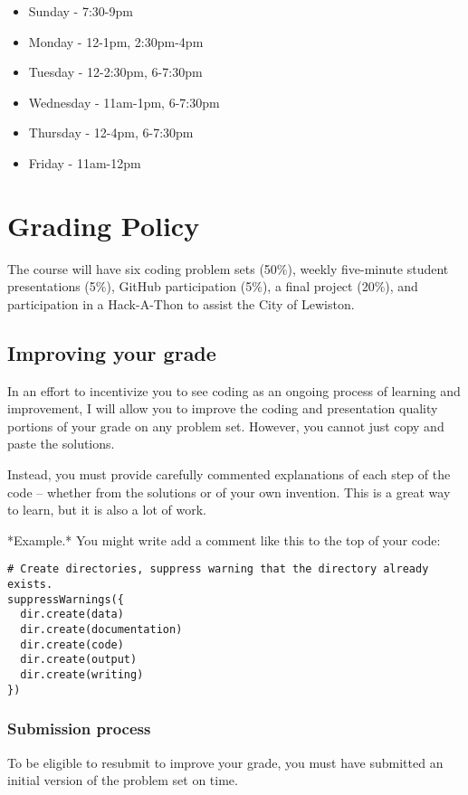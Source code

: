 \documentclass[11pt]{article}
\begin{document}
\begin{itemize}
  \item Sunday - 7:30-9pm
  \item Monday - 12-1pm, 2:30pm-4pm
  \item Tuesday - 12-2:30pm, 6-7:30pm
  \item Wednesday - 11am-1pm, 6-7:30pm
  \item Thursday - 12-4pm, 6-7:30pm
  \item Friday - 11am-12pm
\end{itemize}

\section*{Grading Policy}
The course will have six coding problem sets (50\%), weekly five-minute student presentations (5\%), GitHub participation (5\%), a final project (20\%), and participation in a Hack-A-Thon to assist the City of Lewiston.

\subsection*{Improving your grade}

In an effort to incentivize you to see coding as an ongoing process of learning and improvement, I will allow you to improve the coding and presentation quality portions of your grade on any problem set. However, you cannot just copy and paste the solutions. 

Instead, you must provide carefully commented explanations of each step of the code -- whether from the solutions or of your own invention. This is a great way to learn, but it is also a lot of work. 

*Example.* You might write add a comment like this to the top of your code:

\begin{verbatim}
# Create directories, suppress warning that the directory already exists. 
suppressWarnings({
  dir.create(data)
  dir.create(documentation)
  dir.create(code)
  dir.create(output)
  dir.create(writing)
})
\end{verbatim}

\subsubsection*{Submission process}

To be eligible to resubmit to improve your grade, you must have submitted an initial version of the problem set on time.
\end{document}
